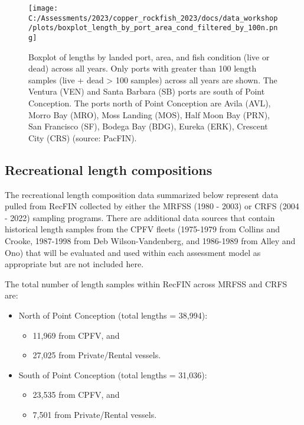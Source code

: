 \documentclass[
]{article}
\providecommand{\tightlist}{%
  \setlength{\itemsep}{0pt}\setlength{\parskip}{0pt}}
\begin{document}
\begin{figure}
\centering
\texttt{[image: C:/Assessments/2023/copper\_rockfish\_2023/docs/data\_workshop/plots/boxplot\_length\_by\_port\_area\_cond\_filtered\_by\_100n.png]}
\caption{Boxplot of lengths by landed port, area, and fish condition
(live or dead) across all years. Only ports with greater than 100 length
samples (live + dead \textgreater{} 100 samples) across all years are
shown. The Ventura (VEN) and Santa Barbara (SB) ports are south of Point
Conception. The ports north of Point Conception are Avila (AVL), Morro
Bay (MRO), Moss Landing (MOS), Half Moon Bay (PRN), San Francisco (SF),
Bodega Bay (BDG), Eureka (ERK), Crescent City (CRS) (source:
PacFIN).\label{fig:com-boxplot-length-port}}
\end{figure}

\hypertarget{recreational-length-compositions}{%
\subsection{Recreational length
compositions}\label{recreational-length-compositions}}

The recreational length composition data summarized below represent data
pulled from RecFIN collected by either the MRFSS (1980 - 2003) or CRFS
(2004 - 2022) sampling programs. There are additional data sources that
contain historical length samples from the CPFV fleets (1975-1979 from
Collins and Crooke, 1987-1998 from Deb Wilson-Vandenberg, and 1986-1989
from Alley and Ono) that will be evaluated and used within each
assessment model as appropriate but are not included here.

The total number of length samples within RecFIN across MRFSS and CRFS
are:

\begin{itemize}
\tightlist
\item
  North of Point Conception (total lengths = 38,994):

  \begin{itemize}
  \tightlist
  \item
    11,969 from CPFV, and
  \item
    27,025 from Private/Rental vessels.
  \end{itemize}
\item
  South of Point Conception (total lengths = 31,036):

  \begin{itemize}
  \tightlist
  \item
    23,535 from CPFV, and
  \item
    7,501 from Private/Rental vessels.
  \end{itemize}
\end{itemize}
\end{document}
